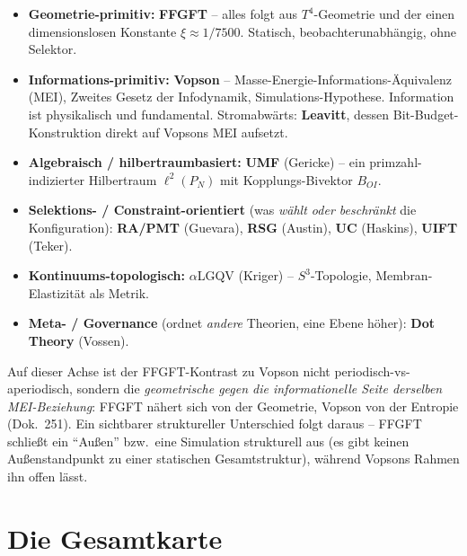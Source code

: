 \begin{itemize}
  \item \textbf{Geometrie-primitiv:} \textbf{FFGFT} -- alles folgt aus $T^4$-Geometrie und
        der einen dimensionslosen Konstante $\xi\approx 1/7500$. Statisch, beobachterunabhängig,
        ohne Selektor.
  \item \textbf{Informations-primitiv:} \textbf{Vopson} -- Masse-Energie-Informations-Äquivalenz
        (MEI), Zweites Gesetz der Infodynamik, Simulations-Hypothese. Information ist physikalisch
        und fundamental. Stromabwärts: \textbf{Leavitt}, dessen Bit-Budget-Konstruktion direkt auf
        Vopsons MEI aufsetzt.
  \item \textbf{Algebraisch / hilbertraumbasiert:} \textbf{UMF} (Gericke) -- ein primzahl-indizierter
        Hilbertraum $\ell^2(P_N)$ mit Kopplungs-Bivektor $B_{OI}$.
  \item \textbf{Selektions- / Constraint-orientiert} (was \emph{wählt oder beschränkt} die
        Konfiguration): \textbf{RA/PMT} (Guevara), \textbf{RSG} (Austin), \textbf{UC} (Haskins),
        \textbf{UIFT} (Teker).
  \item \textbf{Kontinuums-topologisch:} $\alpha$LGQV (Kriger) -- $S^3$-Topologie,
        Membran-Elastizität als Metrik.
  \item \textbf{Meta- / Governance} (ordnet \emph{andere} Theorien, eine Ebene höher):
        \textbf{Dot Theory} (Vossen).
\end{itemize}

Auf dieser Achse ist der FFGFT-Kontrast zu Vopson nicht periodisch-vs-aperiodisch, sondern
die \emph{geometrische gegen die informationelle Seite derselben MEI-Beziehung}: FFGFT nähert
sich von der Geometrie, Vopson von der Entropie (Dok.~251). Ein sichtbarer struktureller
Unterschied folgt daraus -- FFGFT schließt ein \enquote{Außen} bzw.\ eine Simulation
strukturell aus (es gibt keinen Außenstandpunkt zu einer statischen Gesamtstruktur), während
Vopsons Rahmen ihn offen lässt.

\section{Die Gesamtkarte}

